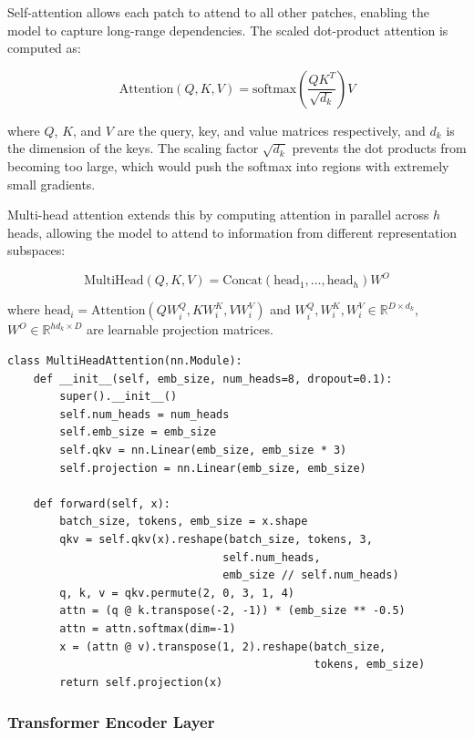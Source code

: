 \documentclass{article}
\begin{document}
Self-attention allows each patch to attend to all other patches, enabling the model to capture long-range dependencies. The scaled dot-product attention is computed as:

\begin{equation}
\text{Attention}(Q, K, V) = \text{softmax}\left(\frac{QK^T}{\sqrt{d_k}}\right)V
\label{eq:attention}
\end{equation}

where $Q$, $K$, and $V$ are the query, key, and value matrices respectively, and $d_k$ is the dimension of the keys. The scaling factor $\sqrt{d_k}$ prevents the dot products from becoming too large, which would push the softmax into regions with extremely small gradients.

Multi-head attention extends this by computing attention in parallel across $h$ heads, allowing the model to attend to information from different representation subspaces:

\begin{equation}
\text{MultiHead}(Q, K, V) = \text{Concat}(\text{head}_1, \ldots, \text{head}_h)W^O
\label{eq:multihead}
\end{equation}

where $\text{head}_i = \text{Attention}(QW_i^Q, KW_i^K, VW_i^V)$ and $W_i^Q, W_i^K, W_i^V \in \mathbb{R}^{D \times d_k}$, $W^O \in \mathbb{R}^{hd_k \times D}$ are learnable projection matrices.

\begin{lstlisting}[caption={Multi-Head Attention Implementation}]
class MultiHeadAttention(nn.Module):
    def __init__(self, emb_size, num_heads=8, dropout=0.1):
        super().__init__()
        self.num_heads = num_heads
        self.emb_size = emb_size
        self.qkv = nn.Linear(emb_size, emb_size * 3)
        self.projection = nn.Linear(emb_size, emb_size)
    
    def forward(self, x):
        batch_size, tokens, emb_size = x.shape
        qkv = self.qkv(x).reshape(batch_size, tokens, 3, 
                                 self.num_heads, 
                                 emb_size // self.num_heads)
        q, k, v = qkv.permute(2, 0, 3, 1, 4)
        attn = (q @ k.transpose(-2, -1)) * (emb_size ** -0.5)
        attn = attn.softmax(dim=-1)
        x = (attn @ v).transpose(1, 2).reshape(batch_size, 
                                               tokens, emb_size)
        return self.projection(x)
\end{lstlisting}

\subsubsection{Transformer Encoder Layer}
\end{document}
